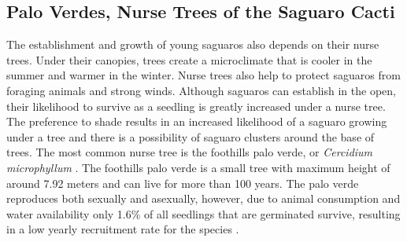 \documentclass[a4paper]{article}
\begin{document}
\subsection{Palo Verdes, Nurse Trees of the Saguaro Cacti}
The establishment and growth of young saguaros also depends on their nurse trees. Under their canopies, trees create a microclimate that is cooler in the summer and warmer in the winter. Nurse trees also help to protect saguaros from foraging animals and strong winds. Although saguaros can establish in the open, their likelihood to survive as a seedling is greatly increased under a nurse tree. The preference to shade results in an increased likelihood of a saguaro growing under a tree and there is a possibility of saguaro clusters around the base of trees. The most common nurse tree is the foothills palo verde, or {\it{Cercidium microphyllum}} \cite{DreznerNurses}. The foothills palo verde is a small tree with maximum height of around 7.92 meters and can live for more than 100 years. The palo verde reproduces both sexually and asexually, however, due to animal consumption and water availability only 1.6\% of all seedlings that are germinated survive, resulting in a low yearly recruitment rate for the species \cite{paloVerdeFacts}. 
\end{document}
